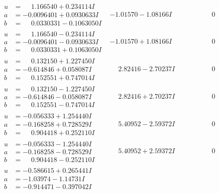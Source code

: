 \documentclass[1p]{elsarticle_modified}
\theoremstyle{definition}
\begin{document}
$$\begin{array}{c|c|c}
\begin{aligned}
u &= \phantom{-}1.166540 + 0.234114 I \\
a &= -0.0096401 + 0.0930633 I \\
b &= \phantom{-}0.0330331 - 0.1063050 I\end{aligned}
 & -1.01570 - 1.08166 I & \phantom{-0.000000 } 0 \\ \hline\begin{aligned}
u &= \phantom{-}1.166540 - 0.234114 I \\
a &= -0.0096401 - 0.0930633 I \\
b &= \phantom{-}0.0330331 + 0.1063050 I\end{aligned}
 & -1.01570 + 1.08166 I & \phantom{-0.000000 } 0 \\ \hline\begin{aligned}
u &= \phantom{-}0.132150 + 1.227450 I \\
a &= -0.614846 + 0.058087 I \\
b &= \phantom{-}0.152551 + 0.747014 I\end{aligned}
 & \phantom{-}2.82416 - 2.70237 I & \phantom{-0.000000 } 0 \\ \hline\begin{aligned}
u &= \phantom{-}0.132150 - 1.227450 I \\
a &= -0.614846 - 0.058087 I \\
b &= \phantom{-}0.152551 - 0.747014 I\end{aligned}
 & \phantom{-}2.82416 + 2.70237 I & \phantom{-0.000000 } 0 \\ \hline\begin{aligned}
u &= -0.056333 + 1.254440 I \\
a &= -0.168258 + 0.728529 I \\
b &= \phantom{-}0.904418 + 0.252110 I\end{aligned}
 & \phantom{-}5.40952 - 2.59372 I & \phantom{-0.000000 } 0 \\ \hline\begin{aligned}
u &= -0.056333 - 1.254440 I \\
a &= -0.168258 - 0.728529 I \\
b &= \phantom{-}0.904418 - 0.252110 I\end{aligned}
 & \phantom{-}5.40952 + 2.59372 I & \phantom{-0.000000 } 0 \\ \hline\begin{aligned}
u &= -0.586615 + 0.265441 I \\
a &= -1.03974 - 1.14731 I \\
b &= -0.914471 - 0.397042 I\end{aligned}

\end{array}$$
\end{document}

